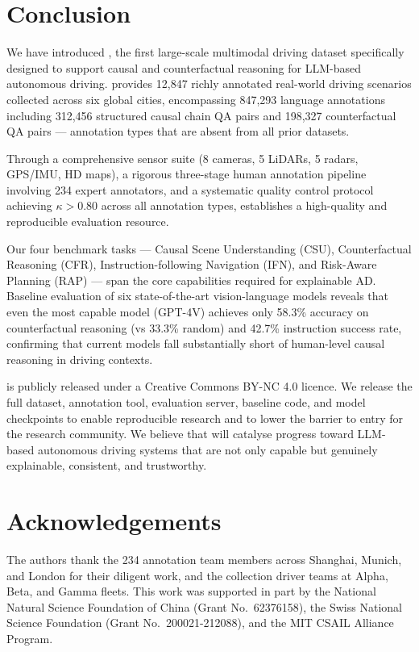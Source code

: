 \section{Conclusion}
\label{sec:conclusion}

We have introduced \lucid{}, the first large-scale multimodal driving dataset
specifically designed to support causal and counterfactual reasoning for LLM-based
autonomous driving. \lucid{} provides 12,847 richly annotated real-world driving
scenarios collected across six global cities, encompassing 847,293 language annotations
including 312,456 structured causal chain QA pairs and 198,327 counterfactual QA pairs
--- annotation types that are absent from all prior datasets.

Through a comprehensive sensor suite (8 cameras, 5 LiDARs, 5 radars, GPS/IMU, HD maps),
a rigorous three-stage human annotation pipeline involving 234 expert annotators, and
a systematic quality control protocol achieving $\kappa > 0.80$ across all annotation
types, \lucid{} establishes a high-quality and reproducible evaluation resource.

Our four benchmark tasks --- Causal Scene Understanding (CSU), Counterfactual
Reasoning (CFR), Instruction-following Navigation (IFN), and Risk-Aware Planning
(RAP) --- span the core capabilities required for explainable AD. Baseline evaluation
of six state-of-the-art vision-language models reveals that even the most capable
model (GPT-4V) achieves only 58.3\% accuracy on counterfactual reasoning (vs 33.3\%
random) and 42.7\% instruction success rate, confirming that current models fall
substantially short of human-level causal reasoning in driving contexts.

\lucid{} is publicly released under a Creative Commons BY-NC 4.0 licence.
We release the full dataset, annotation tool, evaluation server, baseline code,
and model checkpoints to enable reproducible research and to lower the barrier
to entry for the research community. We believe that \lucid{} will catalyse
progress toward LLM-based autonomous driving systems that are not only capable
but genuinely explainable, consistent, and trustworthy.

\section*{Acknowledgements}

The authors thank the 234 annotation team members across Shanghai, Munich, and London
for their diligent work, and the collection driver teams at Alpha, Beta, and Gamma fleets.
This work was supported in part by the National Natural Science Foundation of China
(Grant No.\ 62376158), the Swiss National Science Foundation (Grant No.\ 200021-212088),
and the MIT CSAIL Alliance Program.

